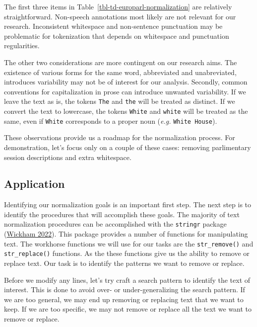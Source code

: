 \documentclass[
  letterpaper,
  DIV=11,
  numbers=noendperiod]{scrreport}
\theoremstyle{definition}
\theoremstyle{remark}
\begin{document}
The first three items in Table~\ref{tbl-td-europarl-normalization} are
relatively straightforward. Non-speech annotations most likely are not
relevant for our research. Inconsistent whitespace and non-sentence
punctuation may be problematic for tokenization that depends on
whitespace and punctuation regularities.

The other two considerations are more contingent on our research aims.
The existence of various forms for the same word, abbreviated and
unabreviated, introduces variability may not be of interest for our
analysis. Secondly, common conventions for capitalization in prose can
introduce unwanted variability. If we leave the text as is, the tokens
\texttt{The} and \texttt{the} will be treated as distinct. If we convert
the text to lowercase, the tokens \texttt{White} and \texttt{white} will
be treated as the same, even if \texttt{White} corresponds to a proper
noun (\emph{e.g.} \texttt{White\ House}).

These observations provide us a roadmap for the normalization process.
For demonstration, let's focus only on a couple of these cases: removing
parlimentary session descriptions and extra whitespace.

\hypertarget{sec-td-normalization-application}{%
\subsection{Application}\label{sec-td-normalization-application}}

Identifying our normalization goals is an important first step. The next
step is to identify the procedures that will accomplish these goals. The
majority of text normalization procedures can be accomplished with the
\texttt{stringr} package (\protect\hyperlink{ref-R-stringr}{Wickham
2022}). This package provides a number of functions for manipulating
text. The workhorse functions we will use for our tasks are the
\texttt{str\_remove()} and \texttt{str\_replace()} functions. As the
these functions give us the ability to remove or replace text. Our task
is to identify the patterns we want to remove or replace.

Before we modify any lines, let's try craft a search pattern to identify
the text of interest. This is done to avoid over- or under-generalizing
the search pattern. If we are too general, we may end up removing or
replacing text that we want to keep. If we are too specific, we may not
remove or replace all the text we want to remove or replace.
\end{document}
